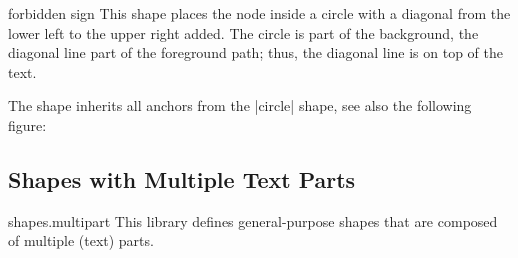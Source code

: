 \begin{shape}{forbidden sign}
  This shape places the node inside a circle with a diagonal from the
  lower left to the upper right added. The circle is part of the
  background, the diagonal line part of the foreground path; thus, the
  diagonal line is on top of the text.
  
\begin{codeexample}[]
\end{codeexample}

  The shape inherits all anchors from the |circle| shape, see also the
  following figure:
\begin{codeexample}[]
\Huge
{}
\end{codeexample}
\end{shape}



\subsection{Shapes with Multiple Text Parts}

\begin{pgflibrary}{shapes.multipart}
  This library defines general-purpose shapes that are composed of
  multiple (text) parts. 
\end{pgflibrary}


